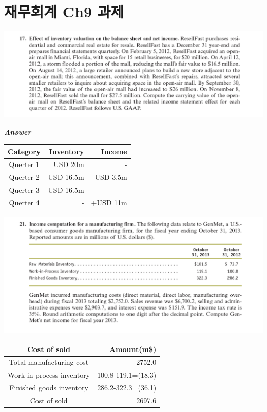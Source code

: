\documentclass[
  a4paper,
  DIV=11,
  numbers=noendperiod]{scrreprt}
\begin{document}
\chapter*{재무회계 Ch9
과제}\label{uxc7acuxbb34uxd68cuxacc4-ch9-uxacfcuxc81c}


\includegraphics{images/재무회계9-17.png}

\textbf{\emph{Answer}}

\begin{longtable}[]{@{}crr@{}}
\toprule\noalign{}
Category & Inventory & Income \\
\midrule\noalign{}
\endhead
\bottomrule\noalign{}
\endlastfoot
Querter 1 & USD 20m & - \\
Querter 2 & USD 16.5m & -USD 3.5m \\
Querter 3 & USD 16.5m & - \\
Querter 4 & - & +USD 11m \\
\end{longtable}

\includegraphics{images/재무회계9-21.png}

\begin{longtable}[]{@{}cr@{}}
\toprule\noalign{}
Cost of sold & Amount(m\$) \\
\midrule\noalign{}
\endhead
\bottomrule\noalign{}
\endlastfoot
Total manufacturing cost & 2752.0 \\
Work in process inventory & 100.8-119.1=(18.3) \\
Finished goods inventory & 286.2-322.3=(36.1) \\
Cost of sold & 2697.6 \\
\end{longtable}
\end{document}
